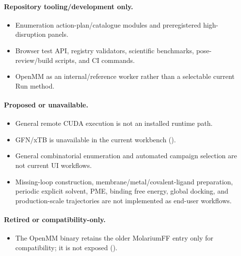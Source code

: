 \documentclass[11pt]{article}
\begin{document}
\begin{small}
\paragraph{Repository tooling/development only.}

\begin{itemize}[leftmargin=*]

\item Enumeration action-plan/catalogue modules and preregistered high-disruption panels.

\item Browser test API, registry validators, scientific benchmarks, pose-review/build scripts, and CI commands.

\item OpenMM as an internal/reference worker rather than a selectable current Run method.

\end{itemize}

\paragraph{Proposed or unavailable.}

\begin{itemize}[leftmargin=*]

\item General remote CUDA execution is not an installed runtime path.

\item GFN/xTB is unavailable in the current workbench ().

\item General combinatorial enumeration and automated campaign selection are not current UI workflows.

\item Missing-loop construction, membrane/metal/covalent-ligand preparation, periodic explicit solvent, PME, binding free energy, global docking, and production-scale trajectories are not implemented as end-user workflows.

\end{itemize}

\paragraph{Retired or compatibility-only.}

\begin{itemize}[leftmargin=*]

\item The OpenMM binary retains the older MolariumFF entry only for compatibility; it is not exposed ().


\end{itemize}
\end{small}
\end{document}
